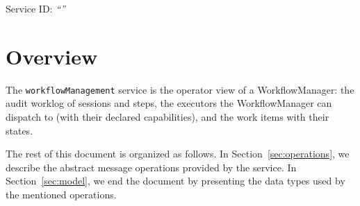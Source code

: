 \documentclass[a4paper]{arrowhead}
\begin{document}
\ArrowheadSetup

\begin{center}
  \vspace*{1cm}
  \huge{\arrowtitle}

  \vspace*{0.2cm}
  \LARGE{\arrowtype}
  \vspace*{1cm}

  \Large{Service ID: \textit{``\arrowid''}}
  \vspace*{\fill}

  

  \vspace*{1cm}
  \vspace*{\fill}

  \begin{abstract}
    This document describes the \texttt{workflow\allowbreak{}Management} service of the Eclipse Arrowhead workflow support systems, which gives operators the worklog, the known executors and the work items. It is provided by the WorkflowManager system, service version 1.0.0, documentation edition 5.4.0.
  \end{abstract}

  \vspace*{1cm}
\end{center}

\newpage

\tableofcontents
\newpage

\section{Overview}
\label{sec:overview}
The \texttt{workflow\allowbreak{}Management} service is the operator view of a WorkflowManager: the audit worklog
of sessions and steps, the executors the WorkflowManager can dispatch to (with their declared capabilities), and the
work items with their states.

The rest of this document is organized as follows.
In Section~\ref{sec:operations}, we describe the abstract message operations provided by the service.
In Section~\ref{sec:model}, we end the document by presenting the data types used by the mentioned operations.
\end{document}
